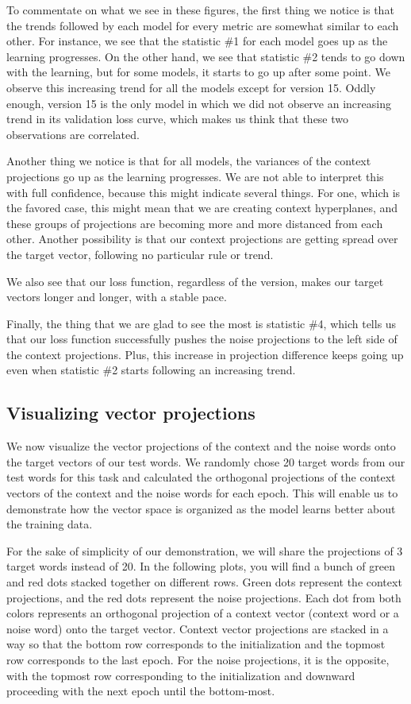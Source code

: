 To commentate on what we see in these figures, the first thing we notice is that the trends followed by each model for every metric are somewhat similar to each other. For instance, we see that the statistic \#1 for each model goes up as the learning progresses. On the other hand, we see that statistic \#2 tends to go down with the learning, but for some models, it starts to go up after some point. We observe this increasing trend for all the models except for version 15. Oddly enough, version 15 is the only model in which we did not observe an increasing trend in its validation loss curve, which makes us think that these two observations are correlated.

Another thing we notice is that for all models, the variances of the context projections go up as the learning progresses. We are not able to interpret this with full confidence, because this might indicate several things. For one, which is the favored case, this might mean that we are creating context hyperplanes, and these groups of projections are becoming more and more distanced from each other. Another possibility is that our context projections are getting spread over the target vector, following no particular rule or trend.

We also see that our loss function, regardless of the version, makes our target vectors longer and longer, with a stable pace. 

Finally, the thing that we are glad to see the most is statistic \#4, which tells us that our loss function successfully pushes the noise projections to the left side of the context projections. Plus, this increase in projection difference keeps going up even when statistic \#2 starts following an increasing trend. 


\subsection{Visualizing vector projections}
\label{sec:vis_proj}

We now visualize the vector projections of the context and the noise words onto the target vectors of our test words. We randomly chose 20 target words from our test words for this task and calculated the orthogonal projections of the context vectors of the context and the noise words for each epoch. This will enable us to demonstrate how the vector space is organized as the model learns better about the training data.

For the sake of simplicity of our demonstration, we will share the projections of 3 target words instead of 20. In the following plots, you will find a bunch of green and red dots stacked together on different rows. Green dots represent the context projections, and the red dots represent the noise projections. Each dot from both colors represents an orthogonal projection of a context vector (context word or a noise word) onto the target vector. Context vector projections are stacked in a way so that the bottom row corresponds to the initialization and the topmost row corresponds to the last epoch. For the noise projections, it is the opposite, with the topmost row corresponding to the initialization and downward proceeding with the next epoch until the bottom-most. 

